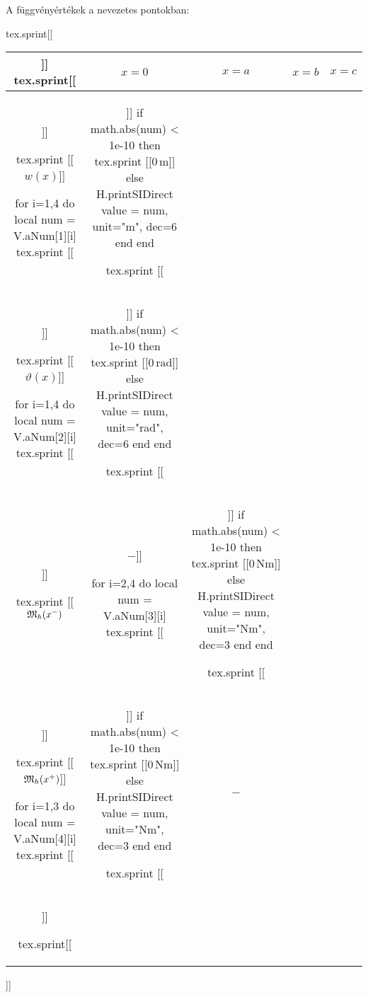 A függvényértékek a nevezetes pontokban:
\begin{center}
\def\arraystretch{1.25}
\begin{luacode*}
  tex.sprint[[\begin{tabular}{c|cccc|}]]
  tex.sprint[[& $x = 0$ & $x = a$ & $x = b$ & $x = c$ \\\hline]]

  tex.sprint [[$w(x)$]]

  for i=1,4 do
    local num = V.aNum[1][i]
    tex.sprint [[&]]
    if math.abs(num) < 1e-10 then
      tex.sprint [[$0\,\mathrm{m}$]]
    else
      H.printSIDirect { value = num, unit="m", dec=6 }
    end
  end

  tex.sprint [[\\]]

  tex.sprint [[$\vartheta(x)$]]

  for i=1,4 do
    local num = V.aNum[2][i]
    tex.sprint [[&]]
    if math.abs(num) < 1e-10 then
      tex.sprint [[$0\,\mathrm{rad}$]]
    else
      H.printSIDirect { value = num, unit="rad", dec=6 }
    end
  end

  tex.sprint [[\\]]

  tex.sprint [[$\mathfrak{M}_h(x^-)$ & $-$]]

  for i=2,4 do
    local num = V.aNum[3][i]
    tex.sprint [[&]]
    if math.abs(num) < 1e-10 then
      tex.sprint [[$0\,\mathrm{Nm}$]]
    else
      H.printSIDirect { value = num, unit="Nm", dec=3 }
    end
  end

  tex.sprint [[\\]]

  tex.sprint [[$\mathfrak{M}_h(x^+)$]]

  for i=1,3 do
    local num = V.aNum[4][i]
    tex.sprint [[&]]
    if math.abs(num) < 1e-10 then
      tex.sprint [[$0\,\mathrm{Nm}$]]
    else
      H.printSIDirect { value = num, unit="Nm", dec=3 }
    end
  end

  tex.sprint [[& $-$ \\\hline]]

  tex.sprint[[\end{tabular}]]
\end{luacode*}
\end{center}
